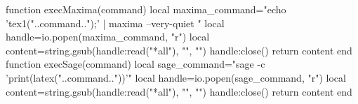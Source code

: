 \documentclass[a4paper]{ltjsarticle}
\begin{document}

\begin{luacode*}
function execMaxima(command)
  local maxima_command="echo 'tex1("..command..");' | maxima --very-quiet "
  local handle=io.popen(maxima_command, "r")
  local content=string.gsub(handle:read("*all"), "\n", "")
  handle:close()
  return content
end
function execSage(command)
  local sage_command="sage -c 'print(latex("..command.."))'"
  local handle=io.popen(sage_command, "r")
  local content=string.gsub(handle:read("*all"), "\n", "")
  handle:close()
  return content
end
\end{luacode*}




\end{document}
